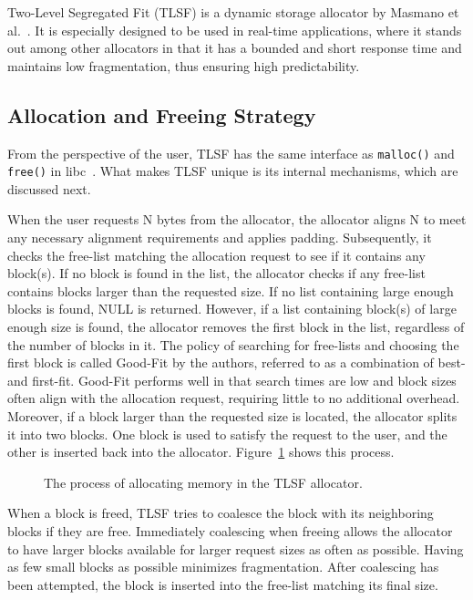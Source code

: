 
Two-Level Segregated Fit (TLSF) is a dynamic storage allocator by Masmano et al.~\cite{TLSF}. It is especially designed to be used in real-time applications, where it stands out among other allocators in that it has a bounded and short response time and maintains low fragmentation, thus ensuring high predictability. 

\subsection{Allocation and Freeing Strategy}

From the perspective of the user, TLSF has the same interface as \texttt{malloc()} and \texttt{free()} in libc~\cite{mallocman}. What makes TLSF unique is its internal mechanisms, which are discussed next.

When the user requests N bytes from the allocator, the allocator aligns N to meet any necessary alignment requirements and applies padding. Subsequently, it checks the free-list matching the allocation request to see if it contains any block(s). If no block is found in the list, the allocator checks if any free-list contains blocks larger than the requested size. If no list containing large enough blocks is found, NULL is returned. However, if a list containing block(s) of large enough size is found, the allocator removes the first block in the list, regardless of the number of blocks in it. The policy of searching for free-lists and choosing the first block is called Good-Fit by the authors, referred to as a combination of best- and first-fit. Good-Fit performs well in that search times are low and block sizes often align with the allocation request, requiring little to no additional overhead. Moreover, if a block larger than the requested size is located, the allocator splits it into two blocks. One block is used to satisfy the request to the user, and the other is inserted back into the allocator. Figure~\ref{fig:tlsf_allocation} shows this process.

\begin{figure}[h]
    \centering
    
    \caption{The process of allocating memory in the TLSF allocator.}
    \label{fig:tlsf_allocation}
\end{figure}

When a block is freed, TLSF tries to coalesce the block with its neighboring blocks if they are free. Immediately coalescing when freeing allows the allocator to have larger blocks available for larger request sizes as often as possible. Having as few small blocks as possible minimizes fragmentation. After coalescing has been attempted, the block is inserted into the free-list matching its final size.

